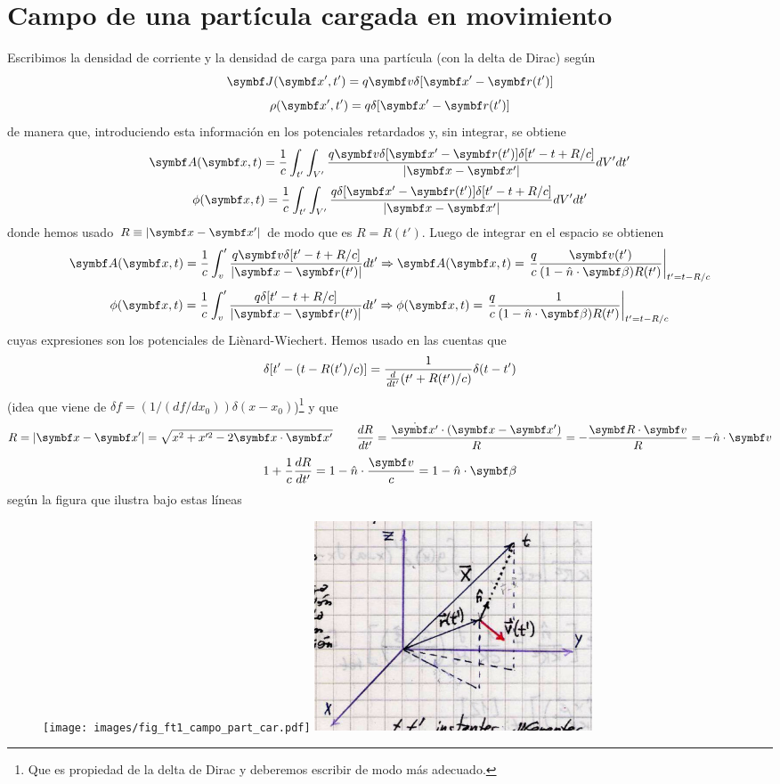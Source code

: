 \documentclass[10pt,oneside]{CBFT_book}
\begin{document}
\section{Campo de una partícula cargada en movimiento}

Escribimos la densidad de corriente y la densidad de carga para una partícula
(con la delta de Dirac) según
\[
	\vb{J}(\vb{x}',t') = q\vb{v} \delta[ \vb{x}' - \vb{r}(t')]
\]
\[
	\rho(\vb{x}',t') = q \delta[ \vb{x}' - \vb{r}(t')]
\]
de manera que, introduciendo esta información en los potenciales retardados y, sin integrar,
se obtiene
\[
	\vb{A}(\vb{x},t) = \frac{1}{c} \int_{t'}\int_{V'} 
	\frac{ q\vb{v} \delta[ \vb{x}' - \vb{r}(t')] \delta[ t'-t +R/c] }{|\vb{x} -\vb{x}'|} dV' dt'
\]
\[
	\phi(\vb{x},t) = \frac{1}{c} \int_{t'}\int_{V'} 
	\frac{ q \delta[ \vb{x}' - \vb{r}(t')] \delta[ t'-t +R/c] }{|\vb{x} -\vb{x}'|} dV' dt'
\]
donde hemos usado $R\equiv |\vb{x}-\vb{x}'|$ de modo que es $R = R(t')$.
Luego de integrar en el espacio se obtienen
\[
	\vb{A}(\vb{x},t) = \frac{1}{c} \int_v' \frac{ q\vb{v} \delta[ t'-t +R/c] }{|\vb{x} -\vb{r}(t')|} dt' 
	\Rightarrow \vb{A}(\vb{x},t) = \left. \frac{q}{c} \frac{\vb{v}(t')}
	{(1-\hat{n}\cdot{\vb{\beta}})R(t')} \right|_{t'=t-R/c}
\]
\[
	\phi(\vb{x},t) = \frac{1}{c} \int_v' \frac{q \delta[ t'-t +R/c]}{|\vb{x} -\vb{r}(t')|} dt' 
	\Rightarrow \phi(\vb{x},t) = \left. \frac{q}{c} \frac{1}{(1-\hat{n}\cdot{\vb{\beta}})R(t')} 
	\right|_{t'=t-R/c}
\]
cuyas expresiones son los potenciales de Liènard-Wiechert. Hemos usado en las cuentas que 
\[
	\delta[t' - ( t - R(t')/c )] = \frac{1}{\frac{d^{\hspace{-0.05em}} {}}{d {t'}^{\hspace{-0.05em}}}( t' + R(t')/c )} \delta( t-t')
\]
(idea que viene de $\delta f = (1/(df/dx_0)) \delta(x-x_0) $)\footnote{Que es propiedad de
la delta de Dirac y deberemos escribir de modo más adecuado.} y que 
\[
	R = |\vb{x}-\vb{x}'| = \sqrt{ x^2 + x'^2 - 2\pe{x}{x'} } \qquad \dtot{R}{t'} = 
	\frac{\dot{\vb{x}'}\cdot(\vb{x}-\vb{x}')}{R} = -\frac{\pe{R}{v}}{R} = -\hat{n}\cdot\vb{v}
\]
\[
	1 + \frac{1}{c} \dtot{R}{t'}  = 1 -\hat{n}\cdot\frac{\vb{v}}{c} = 1 - \hat{n}\cdot\vb{\beta}
\]
según la figura que ilustra bajo estas líneas

\begin{figure}[htb]
	\begin{center}
	\texttt{[image: images/fig\_ft1\_campo\_part\_car.pdf]}
	\includegraphics[width=0.4\textwidth]{images/fig_ft1_campo_part_carJPG.jpg}
	\end{center}
	\caption{}
\end{figure} 
\end{document}
